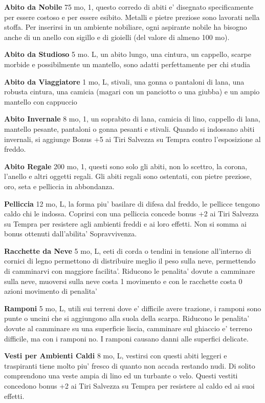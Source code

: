 \documentclass[a4paper,11pt,twoside,openany]{book}
\begin{document}
{\textbf{Abito da Nobile} 75 mo, 1, questo corredo di abiti e' disegnato specificamente per essere costoso e per essere esibito. Metalli e pietre preziose sono lavorati nella stoffa. Per inserirsi in un ambiente nobiliare, ogni aspirante nobile ha bisogno anche di un anello con sigillo e di gioielli (del valore di almeno 100 mo).

\textbf{Abito da Studioso} 5 mo. L, un abito lungo, una cintura, un cappello, scarpe morbide e possibilmente un mantello, sono adatti perfettamente per chi studia

\textbf{Abito da Viaggiatore} 1 mo, L, stivali, una gonna o pantaloni di lana, una robusta cintura, una camicia (magari con un panciotto o una giubba) e un ampio mantello con cappuccio

\textbf{Abito Invernale} 8 mo, 1, un soprabito di lana, camicia di lino, cappello di lana, mantello pesante, pantaloni o gonna pesanti e stivali. Quando si indossano abiti invernali, si aggiunge Bonus +5 ai Tiri Salvezza su Tempra contro l'esposizione al freddo.

\textbf{Abito Regale} 200 mo, 1,  questi sono solo gli abiti, non lo scettro, la corona, l'anello e altri oggetti regali. Gli abiti regali sono ostentati, con pietre preziose, oro, seta e pelliccia in abbondanza.

\textbf{Pelliccia} 12 mo, L, la forma piu' basilare di difesa dal freddo, le pellicce tengono caldo chi le indossa. Coprirsi con una pelliccia concede bonus +2 ai Tiri Salvezza su Tempra per resistere agli ambienti freddi e ai loro effetti. Non si somma ai bonus ottenuti dall'abilita' Sopravvivenza.

\textbf{Racchette da Neve} 5 mo, L, eeti di corda o tendini in tensione all'interno di cornici di legno permettono di distribuire meglio il peso sulla neve, permettendo di camminarvi con maggiore facilita'. Riducono le penalita' dovute a camminare sulla neve, muoversi sulla neve costa 1 movimento e con le racchette costa 0 azioni movimento di penalita'

\textbf{Ramponi} 5 mo, L, utili sui terreni dove e' difficile avere trazione, i ramponi sono punte o uncini che si aggiungono alla suola della scarpa. Riducono le penalita' dovute al camminare su una superficie liscia, camminare sul ghiaccio e' terreno difficile, ma con i ramponi no. I ramponi causano danni alle superfici delicate.

\textbf{Vesti per Ambienti Caldi} 8 mo, L, vestirsi con questi abiti leggeri e traspiranti tiene molto piu' fresco di quanto non accada restando nudi. Di solito comprendono una veste ampia di lino ed un turbante o velo. Questi vestiti concedono bonus +2 ai Tiri Salvezza su Tempra per resistere al caldo ed ai suoi effetti. 

}
\end{document}

